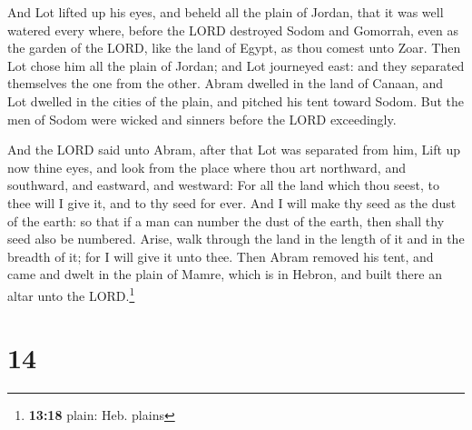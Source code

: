 And Lot lifted up his eyes, and beheld all the plain of
Jordan, that it was well watered every where, before the LORD destroyed
Sodom and Gomorrah, even as the garden of the LORD, like the land of
Egypt, as thou comest unto Zoar.  Then Lot chose him all
the plain of Jordan; and Lot journeyed east: and they separated
themselves the one from the other.  Abram dwelled in the
land of Canaan, and Lot dwelled in the cities of the plain, and pitched
his tent toward Sodom.  But the men of Sodom were wicked
and sinners before the LORD exceedingly.

 And the LORD said unto Abram, after that Lot was
separated from him, Lift up now thine eyes, and look from the place
where thou art northward, and southward, and eastward, and westward:
 For all the land which thou seest, to thee will I give
it, and to thy seed for ever.  And I will make thy seed
as the dust of the earth: so that if a man can number the dust of the
earth, then shall thy seed also be numbered.  Arise, walk
through the land in the length of it and in the breadth of it; for I
will give it unto thee.  Then Abram removed his tent, and
came and dwelt in the plain of Mamre, which is in Hebron, and built
there an altar unto the LORD.\footnote{\textbf{13:18} plain: Heb. plains}

\hypertarget{section-13}{%
\section{14}\label{section-13}}


